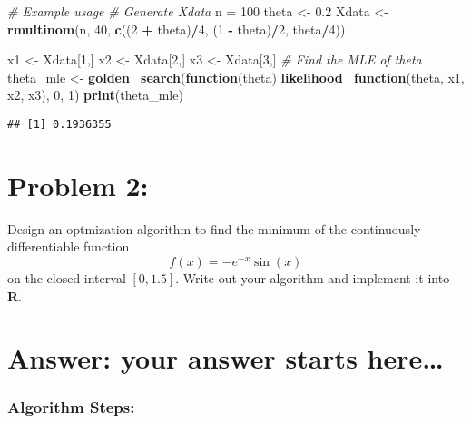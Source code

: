 \documentclass[
]{article}
\newenvironment{Shaded}{\begin{snugshade}}{\end{snugshade}}
\newcommand{\CommentTok}[1]{\textcolor[rgb]{0.56,0.35,0.01}{\textit{#1}}}
\newcommand{\ControlFlowTok}[1]{\textcolor[rgb]{0.13,0.29,0.53}{\textbf{#1}}}
\newcommand{\DecValTok}[1]{\textcolor[rgb]{0.00,0.00,0.81}{#1}}
\newcommand{\FloatTok}[1]{\textcolor[rgb]{0.00,0.00,0.81}{#1}}
\newcommand{\FunctionTok}[1]{\textcolor[rgb]{0.13,0.29,0.53}{\textbf{#1}}}
\newcommand{\NormalTok}[1]{#1}
\newcommand{\OtherTok}[1]{\textcolor[rgb]{0.56,0.35,0.01}{#1}}
\newcommand{\SpecialCharTok}[1]{\textcolor[rgb]{0.81,0.36,0.00}{\textbf{#1}}}
\begin{document}
\begin{Shaded}
\begin{Highlighting}[]
\CommentTok{\# Example usage }
\CommentTok{\# Generate Xdata}
\NormalTok{n }\OtherTok{=} \DecValTok{100}
\NormalTok{theta }\OtherTok{\textless{}{-}} \FloatTok{0.2}
\NormalTok{Xdata }\OtherTok{\textless{}{-}} \FunctionTok{rmultinom}\NormalTok{(n, }\DecValTok{40}\NormalTok{, }\FunctionTok{c}\NormalTok{((}\DecValTok{2} \SpecialCharTok{+}\NormalTok{ theta)}\SpecialCharTok{/}\DecValTok{4}\NormalTok{, (}\DecValTok{1} \SpecialCharTok{{-}}\NormalTok{ theta)}\SpecialCharTok{/}\DecValTok{2}\NormalTok{, theta}\SpecialCharTok{/}\DecValTok{4}\NormalTok{))}


\NormalTok{x1 }\OtherTok{\textless{}{-}}\NormalTok{ Xdata[}\DecValTok{1}\NormalTok{,]  }
\NormalTok{x2 }\OtherTok{\textless{}{-}}\NormalTok{ Xdata[}\DecValTok{2}\NormalTok{,]  }
\NormalTok{x3 }\OtherTok{\textless{}{-}}\NormalTok{ Xdata[}\DecValTok{3}\NormalTok{,]  }
\CommentTok{\# Find the MLE of theta}
\NormalTok{theta\_mle }\OtherTok{\textless{}{-}} \FunctionTok{golden\_search}\NormalTok{(}\ControlFlowTok{function}\NormalTok{(theta) }\FunctionTok{likelihood\_function}\NormalTok{(theta, x1, x2, x3), }\DecValTok{0}\NormalTok{, }\DecValTok{1}\NormalTok{)}
\FunctionTok{print}\NormalTok{(theta\_mle)}
\end{Highlighting}
\end{Shaded}

\begin{verbatim}
## [1] 0.1936355
\end{verbatim}

\hypertarget{problem-2}{%
\section{Problem 2:}\label{problem-2}}

Design an optmization algorithm to find the minimum of the continuously
differentiable function \[f(x) =-e^{-x}\sin(x)\] on the closed interval
\([0,1.5]\). Write out your algorithm and implement it into \textbf{R}.

\hypertarget{answer-your-answer-starts-here-1}{%
\section{Answer: your answer starts
here\ldots{}}\label{answer-your-answer-starts-here-1}}

\hypertarget{algorithm-steps}{%
\subsubsection{Algorithm Steps:}\label{algorithm-steps}}
\end{document}
